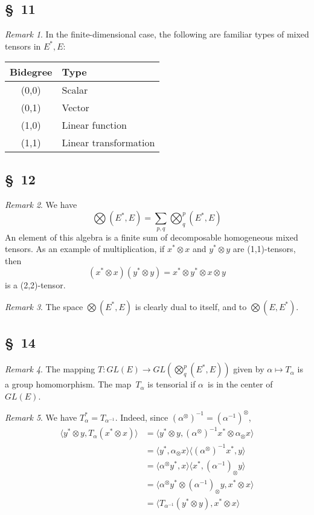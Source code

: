 \documentclass[letterpaper,12pt]{article}
\newcommand{\tprod}{\otimes}
\newcommand{\bigtprod}{\bigotimes}
\newcommand{\medtprod}{{\textstyle\bigtprod}}
\newcommand{\sprod}[2]{\langle#1,#2\rangle}
\theoremstyle{definition}
\theoremstyle{remark}
\newtheorem*{rmk}{Remark}
\begin{document}
\subsection*{\S~11}
\begin{rmk}
In the finite-dimensional case, the following are familiar types of mixed tensors in \(E^*,E\):
\begin{center}
\begin{tabular}{|c|l|}
\hline
\textbf{Bidegree}&\textbf{Type}\\
\hline
(0,0)&Scalar\\
(0,1)&Vector\\
(1,0)&Linear function\\
(1,1)&Linear transformation\\
\hline
\end{tabular}
\end{center}
\end{rmk}

\subsection*{\S~12}
\begin{rmk}
We have
\[\medtprod(E^*,E)=\sum_{p,q}\medtprod^p_q(E^*,E)\]
An element of this algebra is a finite sum of decomposable homogeneous mixed tensors. As an example of multiplication, if \(x^*\tprod x\) and \(y^*\tprod y\) are (1,1)-tensors, then
\[(x^*\tprod x)(y^*\tprod y)=x^*\tprod y^*\tprod x\tprod y\]
is a (2,2)-tensor.
\end{rmk}

\begin{rmk}
The space \(\medtprod(E^*,E)\) is clearly dual to itself, and to \(\medtprod(E,E^*)\).
\end{rmk}

\subsection*{\S~14}
\begin{rmk}
The mapping \(T:GL(E)\to GL(\medtprod^p_q(E^*,E))\) given by \(\alpha\mapsto T_{\alpha}\) is a group homomorphism. The map~\(T_{\alpha}\) is tensorial if \(\alpha\)~is in the center of~\(GL(E)\).
\end{rmk}

\begin{rmk}
We have \(T_{\alpha}^*=T_{\alpha^{-1}}\). Indeed, since \((\alpha^{\tprod})^{-1}=(\alpha^{-1})^{\tprod}\),
\begin{align*}
\sprod{y^*\tprod y}{T_{\alpha}(x^*\tprod x)}&=\sprod{y^*\tprod y}{(\alpha^{\tprod})^{-1}x^*\tprod\alpha_{\tprod}x}\\
	&=\sprod{y^*}{\alpha_{\tprod}x}\sprod{(\alpha^{\tprod})^{-1}x^*}{y}\\
	&=\sprod{\alpha^{\tprod}y^*}{x}\sprod{x^*}{(\alpha^{-1})_{\tprod}y}\\
	&=\sprod{\alpha^{\tprod}y^*\tprod(\alpha^{-1})_{\tprod}y}{x^*\tprod x}\\
	&=\sprod{T_{\alpha^{-1}}(y^*\tprod y)}{x^*\tprod x}
\end{align*}
\end{rmk}
\end{document}
